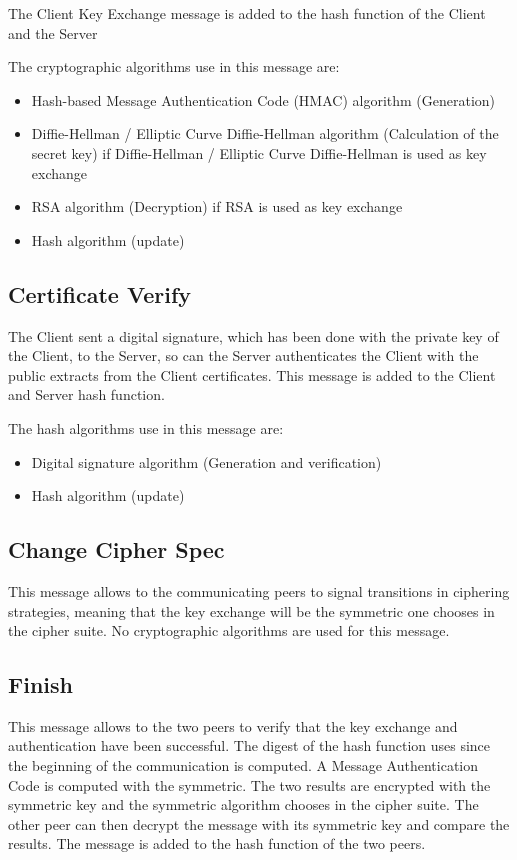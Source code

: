 The Client Key Exchange message is added to the hash function of the Client and
the Server

The cryptographic algorithms use in this message are:
\begin{itemize}[noitemsep]
  \item Hash-based Message Authentication Code (HMAC) algorithm (Generation)
  \item Diffie-Hellman / Elliptic Curve Diffie-Hellman algorithm (Calculation of
  the secret key) if Diffie-Hellman / Elliptic Curve Diffie-Hellman is used as
  key exchange
  \item RSA algorithm (Decryption) if RSA is used as key exchange
  \item Hash algorithm (update)
\end{itemize}

\subsection*{Certificate Verify}
The Client sent a digital signature, which has been done with the private key of
the Client, to the Server, so can the Server authenticates the Client with the
public extracts from the Client certificates.
This message is added to the Client and Server hash function.

The hash algorithms use in this message are:
\begin{itemize}[noitemsep]
  \item Digital signature algorithm (Generation and verification)
  \item Hash algorithm (update)
\end{itemize}


\subsection*{Change Cipher Spec}
This message allows to the communicating peers to signal transitions in
ciphering strategies, meaning that the key exchange will be the symmetric one
chooses in the cipher suite.
No cryptographic algorithms are used for this message.


\subsection*{Finish}
This message allows to the two peers to verify that the key exchange and
authentication have been successful. The digest of the hash function uses since
the beginning of the communication is computed. A Message Authentication Code is
computed with the symmetric.
The two results are encrypted with the symmetric key and the symmetric algorithm
chooses in the cipher suite.
The other peer can then decrypt the message with its symmetric key and compare
the results.
The message is added to the hash function of the two peers.

